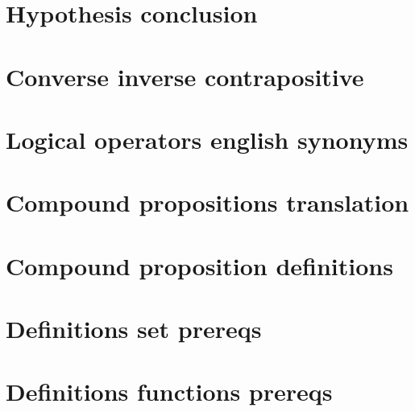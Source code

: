 
\section*{Hypothesis conclusion}

\vfill
\section*{Converse inverse contrapositive}

\vfill
\section*{Logical operators english synonyms}

\vfill
\section*{Compound propositions translation}

\vfill
\section*{Compound proposition definitions}

\vfill
\section*{Definitions set prereqs}

\vfill
\section*{Definitions functions prereqs}

\vfill
